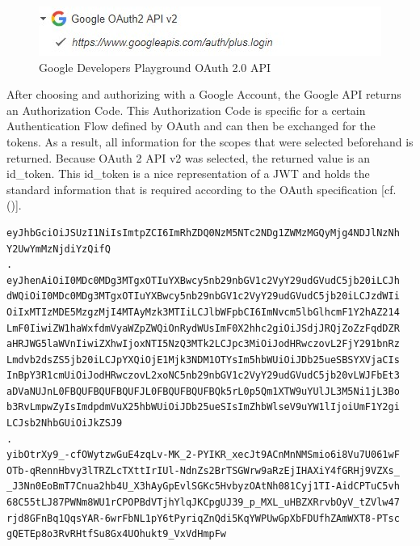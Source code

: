 \begin{figure}[h]
	\centering
	\includegraphics[width=0.8\linewidth]{images/googleOAuthPlaygroundOAuthAPI}
	\caption[OAuth API]{Google Developers Playground OAuth 2.0 API}
	\label{fig:googleoauthplaygroundoauthapi}
\end{figure}

After choosing and authorizing with a Google Account, the Google API returns an Authorization Code. This Authorization Code is specific for a certain Authentication Flow defined by OAuth and can then be exchanged for the tokens. As a result, all information for the scopes that were selected beforehand is returned. Because OAuth 2 API v2 was selected, the returned value is an id\_token. This id\_token is a nice representation of a JWT and holds the standard information that is required according to the OAuth specification  [cf. (\cite{Google:2018:OAuthPlayground})].

\begin{lstlisting}
eyJhbGciOiJSUzI1NiIsImtpZCI6ImRhZDQ0NzM5NTc2NDg1ZWMzMGQyMjg4NDJlNzNh
Y2UwYmMzNjdiYzQifQ
.
eyJhenAiOiI0MDc0MDg3MTgxOTIuYXBwcy5nb29nbGV1c2VyY29udGVudC5jb20iLCJh
dWQiOiI0MDc0MDg3MTgxOTIuYXBwcy5nb29nbGV1c2VyY29udGVudC5jb20iLCJzdWIi
OiIxMTIzMDE5MzgzMjI4MTAyMzk3MTIiLCJlbWFpbCI6ImNvcm5lbGlhcmF1Y2hAZ214
LmF0IiwiZW1haWxfdmVyaWZpZWQiOnRydWUsImF0X2hhc2giOiJSdjJRQjZoZzFqdDZR
aHRJWG5laWVnIiwiZXhwIjoxNTI5NzQ3MTk2LCJpc3MiOiJodHRwczovL2FjY291bnRz
Lmdvb2dsZS5jb20iLCJpYXQiOjE1Mjk3NDM1OTYsIm5hbWUiOiJDb25ueSBSYXVjaCIs
InBpY3R1cmUiOiJodHRwczovL2xoNC5nb29nbGV1c2VyY29udGVudC5jb20vLWJFbEt3
aDVaNUJnL0FBQUFBQUFBQUFJL0FBQUFBQUFBQk5rL0p5Qm1XTW9uYUlJL3M5Ni1jL3Bo
b3RvLmpwZyIsImdpdmVuX25hbWUiOiJDb25ueSIsImZhbWlseV9uYW1lIjoiUmF1Y2gi
LCJsb2NhbGUiOiJkZSJ9
.
yibOtrXy9_-cfOWytzwGuE4zqLv-MK_2-PYIKR_xecJt9ACnMnNMSmio6i8Vu7U061wF
OTb-qRennHbvy3lTRZLcTXttIrIUl-NdnZs2BrTSGWrw9aRzEjIHAXiY4fGRHj9VZXs_
_J3Nn0EoBmT7Cnua2hb4U_X3hAyGpEvlSGKc5HvbyzOAtNh081Cyj1TI-AidCPTuC5vh
68C55tLJ87PWNm8WU1rCPOPBdVTjhYlqJKCpgUJ39_p_MXL_uHBZXRrvbOyV_tZVlw47
rjd8GFnBq1QqsYAR-6wrFbNL1pY6tPyriqZnQdi5KqYWPUwGpXbFDUfhZAmWXT8-PTsc
gQETEp8o3RvRHtfSu8Gx4UOhukt9_VxVdHmpFw
\end{lstlisting}

